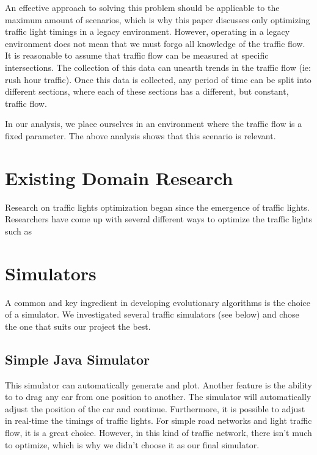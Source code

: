 \documentclass{article} %
\begin{document}
An effective approach to solving this problem should be applicable to the maximum amount of scenarios, which is why this paper discusses only optimizing traffic light timings in a legacy environment.
However, operating in a legacy environment does not mean that we must forgo all knowledge of the traffic flow. It is reasonable to assume that traffic flow can be measured at specific intersections. The collection of this data can unearth trends in the traffic flow (ie: rush hour traffic). Once this data is collected, any period of time can be split into different sections, where each of these sections has a different, but constant, traffic flow.


In our analysis, we place ourselves in an environment where the traffic flow is a fixed parameter. The above analysis shows that this scenario is relevant.

\section{Existing Domain Research}
Research on traffic lights optimization began since the emergence of traffic lights. Researchers have come up with several different ways to optimize the traffic lights such as 

\section{Simulators}
\label{gen_inst}
A common and key ingredient in developing evolutionary algorithms is the choice of a simulator. We investigated several traffic simulators (see below) and chose the one that suits our project the best.

\subsection{Simple Java Simulator}

This simulator can automatically generate and plot. Another feature is the ability to to drag any car from one position to another. The simulator will automatically adjust the position of the car and continue. Furthermore, it is possible to adjust in real-time the timings of traffic lights. For simple road networks and light traffic flow, it is a great choice. However, in this kind of traffic network, there isn't much to optimize, which is why we didn't choose it as our final simulator. 
\end{document}
